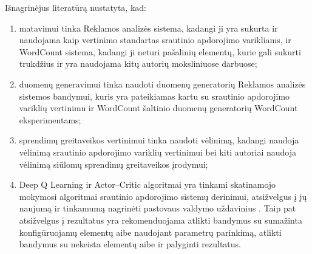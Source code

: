 \documentclass{VUMIFPSbakalaurinis}
\begin{document}
Išnagrinėjus literatūrą nustatyta, kad:
\begin{enumerate}
    \item matavimui tinka Reklamos analizės sistema, kadangi ji yra sukurta ir naudojama kaip vertinimo standartas srautinio apdorojimo varikliams, ir WordCount sistema, kadangi ji neturi pašalinių elementų, kurie gali sukurti trukdžius ir yra naudojama kitų autorių moksliniuose darbuose;
    \item duomenų generavimui tinka naudoti \cite{Chintapalli2016Benchmarking} duomenų generatorių Reklamos analizės sistemos bandymui, kuris yra pateikiamas kartu su srautinio apdorojimo variklių vertinimu ir WordCount šaltinio duomenų generatorių WordCount eksperimentams;
    \item sprendimų greitaveikos vertinimui tinka naudoti vėlinimą, kadangi \cite{Chintapalli2016Benchmarking} naudoja vėlinimą srautinio apdorojimo variklių vertinimui bei kiti autoriai naudoja vėlinimą siūlomų sprendimų greitaveikos įrodymui; 
    \item Deep Q Learning ir Actor–Critic algoritmai yra tinkami skatinamojo mokymosi algoritmai srautinio apdorojimo sistemų derinimui, atsižvelgus į jų naujumą ir tinkamumą nagrinėti pastovaus valdymo uždavinius \cite{Silver2014Deterministic}. Taip pat atsižvelgus į \cite{vaquero2018autotuning, herodotou2020survey} rezultatus yra rekomenduojama atlikti bandymus su sumažinta konfigūruojamų elementų aibe naudojant parametrų parinkimą, atlikti bandymus su nekeista elementų aibe ir palyginti rezultatus.
\end{enumerate}

\printbibliography[heading=bibintoc] 
\end{document}
